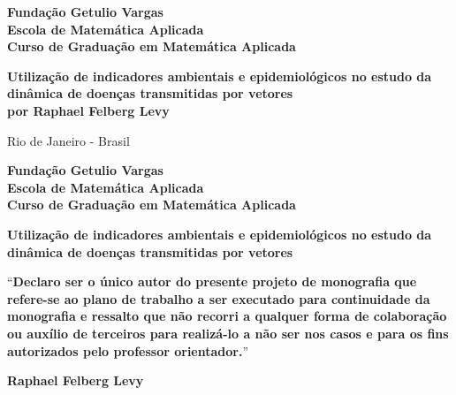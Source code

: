 \documentclass[12pt]{article}
\begin{document}
\begin{titlepage}
\begin{center}
\textbf{\LARGE Fundação Getulio Vargas}\\ 
\textbf{\LARGE Escola de Matemática Aplicada}\\
\textbf{\LARGE Curso de Graduação em Matemática Aplicada}

\par
\vspace{160pt}
\textbf{\Large Utilização de indicadores ambientais e epidemiológicos no estudo da dinâmica de doenças transmitidas por vetores}\\
\vspace{80pt}
\textbf{\Large por Raphael Felberg Levy}\\
\end{center}

\par
\vfill
\begin{center}
{{\normalsize Rio de Janeiro - Brasil}\\
{\normalsize \the\year}}
\end{center}
\end{titlepage}

\thispagestyle{empty}

\newpage
\begin{center}
\textbf{\LARGE Fundação Getulio Vargas}\\ 
\textbf{\LARGE Escola de Matemática Aplicada}\\
\textbf{\LARGE Curso de Graduação em Matemática Aplicada}

\par
\vspace{90pt}
\textbf{\Large Utilização de indicadores ambientais e epidemiológicos no estudo da dinâmica de doenças transmitidas por vetores}


\par
\vspace{65pt}
``\textbf{Declaro ser o único autor do presente projeto de
monografia que refere-se ao plano de trabalho a ser executado para continuidade da monografia e ressalto que não recorri a qualquer forma de colaboração ou auxílio de terceiros para realizá-lo a não ser nos casos e para os fins autorizados pelo professor orientador.}''
\end{center}

\par
\vspace{65pt}
\begin{center}


\hrulefill

\vspace{5pt}
\textbf{\Large Raphael Felberg Levy}
\end{center}
\end{document}
